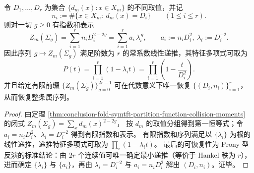 \begin{proposition}[属序列的有限线性递推与纤维谱的可恢复性]\label{prop:conclusion-tqft-genus-linear-recurrence-recovery}
令 \(D_1,\dots,D_r\) 为集合 \(\{d_m(x):x\in X_m\}\) 的不同取值，并记
\[
n_i:=\#\{x\in X_m:\ d_m(x)=D_i\}\qquad(1\le i\le r).
\]
则对一切 \(g\ge 0\) 有指数和表示
\[
Z_m(\Sigma_g)=\sum_{i=1}^r n_iD_i^{2-2g}
=\sum_{i=1}^r a_i\,\lambda_i^{\,g},
\qquad
a_i:=n_iD_i^2,\ \lambda_i:=D_i^{-2}.
\]
因此序列 \(g\mapsto Z_m(\Sigma_g)\) 满足阶数为 \(r\) 的常系数线性递推，其特征多项式可取为
\[
P(t)=\prod_{i=1}^r(1-\lambda_i t)=\prod_{i=1}^r\left(1-\frac{t}{D_i^{2}}\right).
\]
并且给定有限前缀 \(\{Z_m(\Sigma_g)\}_{g=0}^{2r-1}\) 可在代数意义下唯一恢复 \(\{(D_i,n_i)\}_{i=1}^r\)，从而恢复整条属序列。
\end{proposition}
\begin{proof}
由定理 \ref{thm:conclusion-fold-symtft-partition-function-collision-moments} 的闭式
\(
Z_m(\Sigma_g)=\sum_x d_m(x)^{2-2g}
\)，
按 \(d_m\) 的取值分组得到第一恒等式；令 \(a_i=n_iD_i^2\)、\(\lambda_i=D_i^{-2}\) 得到有限指数和表示。
有限指数和序列满足以 \(\{\lambda_i\}\) 为根的线性递推，递推特征多项式可取为 \(\prod_i(1-\lambda_i t)\)。
最后的可恢复性为 Prony 型反演的标准结论：由 \(2r\) 个连续值可唯一确定最小递推（等价于 Hankel 秩为 \(r\)），进而确定 \(\{\lambda_i\}\) 与 \(\{a_i\}\)，再由 \(\lambda_i=D_i^{-2}\) 与 \(a_i=n_iD_i^2\) 解出 \((D_i,n_i)\)。证毕。
\end{proof}

